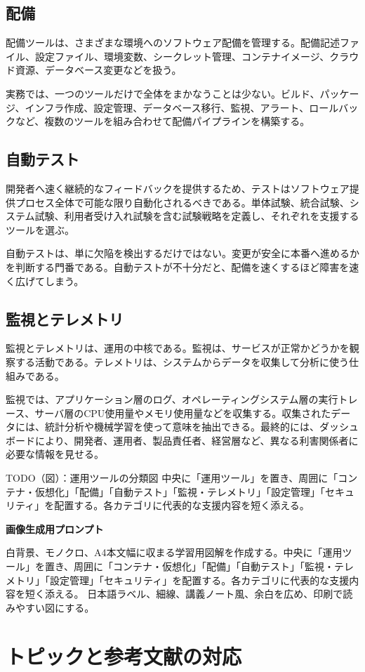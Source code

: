 \documentclass[uplatex,dvipdfmx,a4paper,10pt]{jsarticle}
\newcommand{\todoprompt}[2]{%
\begin{notebox}{TODO（図）：#1}
#2

\textbf{画像生成用プロンプト}

白背景、モノクロ、A4本文幅に収まる学習用図解を作成する。#2 日本語ラベル、細線、講義ノート風、余白を広め、印刷で読みやすい図にする。
\end{notebox}
}
\begin{document}
\subsection{配備}

配備ツールは、さまざまな環境へのソフトウェア配備を管理する。配備記述ファイル、設定ファイル、環境変数、シークレット管理、コンテナイメージ、クラウド資源、データベース変更などを扱う。

実務では、一つのツールだけで全体をまかなうことは少ない。ビルド、パッケージ、インフラ作成、設定管理、データベース移行、監視、アラート、ロールバックなど、複数のツールを組み合わせて配備パイプラインを構築する。

\subsection{自動テスト}

開発者へ速く継続的なフィードバックを提供するため、テストはソフトウェア提供プロセス全体で可能な限り自動化されるべきである。単体試験、統合試験、システム試験、利用者受け入れ試験を含む試験戦略を定義し、それぞれを支援するツールを選ぶ。

自動テストは、単に欠陥を検出するだけではない。変更が安全に本番へ進めるかを判断する門番である。自動テストが不十分だと、配備を速くするほど障害を速く広げてしまう。

\subsection{監視とテレメトリ}

監視とテレメトリは、運用の中核である。監視は、サービスが正常かどうかを観察する活動である。テレメトリは、システムからデータを収集して分析に使う仕組みである。

監視では、アプリケーション層のログ、オペレーティングシステム層の実行トレース、サーバ層のCPU使用量やメモリ使用量などを収集する。収集されたデータには、統計分析や機械学習を使って意味を抽出できる。最終的には、ダッシュボードにより、開発者、運用者、製品責任者、経営層など、異なる利害関係者に必要な情報を見せる。

\todoprompt{運用ツールの分類図}{中央に「運用ツール」を置き、周囲に「コンテナ・仮想化」「配備」「自動テスト」「監視・テレメトリ」「設定管理」「セキュリティ」を配置する。各カテゴリに代表的な支援内容を短く添える。}

\section{トピックと参考文献の対応}
\end{document}
